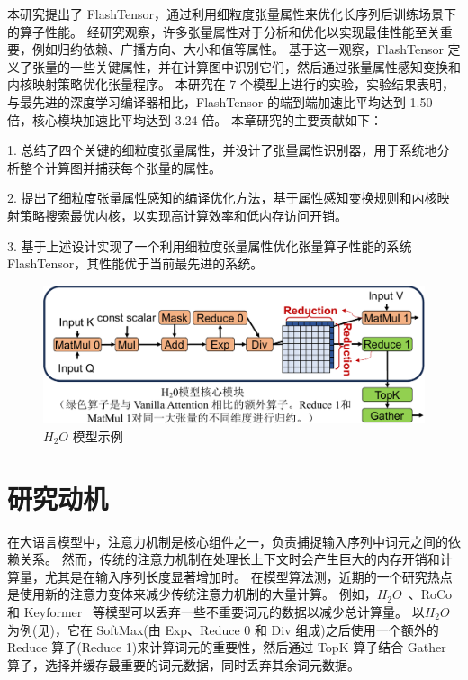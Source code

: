 本研究提出了 FlashTensor，通过利用细粒度张量属性来优化长序列后训练场景下的算子性能。
经研究观察，许多张量属性对于分析和优化以实现最佳性能至关重要，例如归约依赖、广播方向、大小和值等属性。
基于这一观察，FlashTensor 定义了张量的一些关键属性，并在计算图中识别它们，然后通过张量属性感知变换和内核映射策略优化张量程序。
本研究在 7 个模型上进行的实验，实验结果表明，与最先进的深度学习编译器相比，FlashTensor 的端到端加速比平均达到 1.50 倍，核心模块加速比平均达到 3.24 倍。
本章研究的主要贡献如下：

1. 总结了四个关键的细粒度张量属性，并设计了张量属性识别器，用于系统地分析整个计算图并捕获每个张量的属性。

2. 提出了细粒度张量属性感知的编译优化方法，基于属性感知变换规则和内核映射策略搜索最优内核，以实现高计算效率和低内存访问开销。

3. 基于上述设计实现了一个利用细粒度张量属性优化张量算子性能的系统 FlashTensor，其性能优于当前最先进的系统。

\begin{figure}[ht]
    \centering
    \includegraphics[width=0.7\linewidth]{figures/flashtensor/motivation_example_h2o_overview-crop.pdf}
    \caption{\(H_{2}O\) 模型示例}
    \label{fig:flashtensor-motivation_example_h2o_overview}
\end{figure}

\section{研究动机}

在大语言模型中，注意力机制是核心组件之一，负责捕捉输入序列中词元之间的依赖关系。
然而，传统的注意力机制在处理长上下文时会产生巨大的内存开销和计算量，尤其是在输入序列长度显著增加时。
在模型算法测，近期的一个研究热点是使用新的注意力变体来减少传统注意力机制的大量计算。
例如，\(H_{2}O\)~\cite{zhang2024h2o}、RoCo~\cite{ren2024roco} 和 Keyformer~\cite{adnan2024keyformer} 等模型可以丢弃一些不重要词元的数据以减少总计算量。
以\(H_{2}O\)为例(见)，它在 SoftMax(由 Exp、Reduce 0 和 Div 组成)之后使用一个额外的 Reduce 算子(Reduce 1)来计算词元的重要性，然后通过 TopK 算子结合 Gather 算子，选择并缓存最重要的词元数据，同时丢弃其余词元数据。

